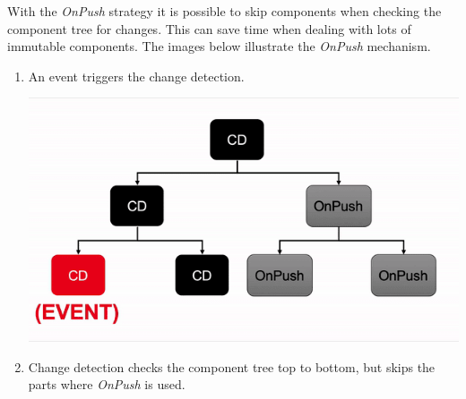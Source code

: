 With the \emph{OnPush} strategy it is possible to skip components when checking the component tree for changes. This can save time when dealing with lots of immutable components.
The images below illustrate the \emph{OnPush} mechanism.
\begin{enumerate}
	\item An event triggers the change detection. \medskip
	
	\includegraphics[width=\linewidth]{onpush-cycle1.png} \medskip
	\item Change detection checks the component tree top to bottom, but skips the parts where \emph{OnPush} is used. \medskip
	

\end{enumerate}
